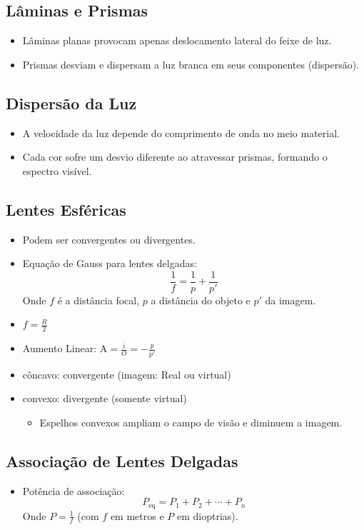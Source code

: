 \documentclass[a4paper,12pt]{article}
\begin{document}
\begin{multicols}{2}
\subsection{Lâminas e Prismas}
\begin{itemize}
    \item Lâminas planas provocam apenas deslocamento lateral do feixe de luz.
    \item Prismas desviam e dispersam a luz branca em seus componentes (dispersão).
\end{itemize}

\subsection{Dispersão da Luz}
\begin{itemize}
    \item A velocidade da luz depende do comprimento de onda no meio material.
    \item Cada cor sofre um desvio diferente ao atravessar prismas, formando o espectro visível.
\end{itemize}

\subsection{Lentes Esféricas}
\begin{itemize}
    \item Podem ser convergentes ou divergentes.
    \item Equação de Gauss para lentes delgadas:
    \[
        \frac{1}{f} = \frac{1}{p} + \frac{1}{p'}
    \]
    Onde $f$ é a distância focal, $p$ a distância do objeto e $p'$ da imagem.
    \item $f = \frac{R}{2}$
    \item Aumento Linear: A$ = \frac{i}{O} = -\frac{p}{p'}$
    \item c\^oncavo: convergente (imagem: Real ou virtual)
    \item convexo: divergente (somente virtual)
    \begin{itemize}
        \item Espelhos convexos ampliam o campo de visão e diminuem a imagem.
    \end{itemize}

\end{itemize}

\subsection{Associação de Lentes Delgadas}
\begin{itemize}
    \item Potência de associação:
    \[
        P_{\text{eq}} = P_1 + P_2 + \cdots + P_n
    \]
    Onde $P = \frac{1}{f}$ (com $f$ em metros e $P$ em dioptrias).
\end{itemize}


\end{multicols}
\end{document}
